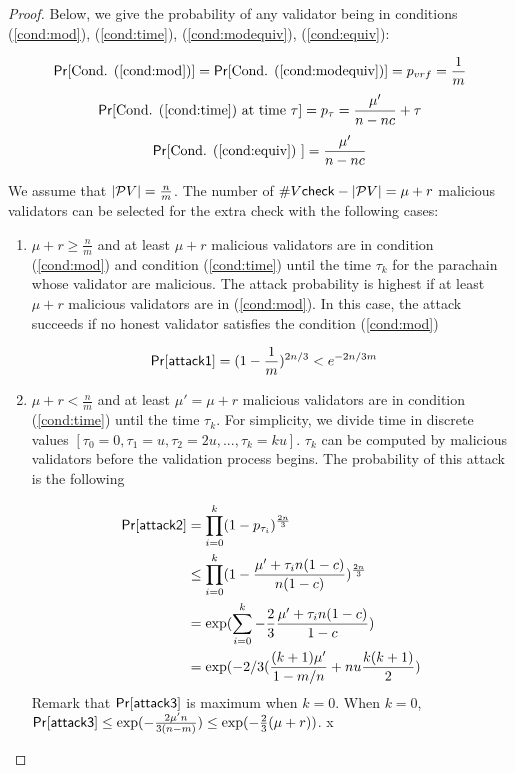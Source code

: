 \begin{proof}

Below, we give the probability of any validator being in conditions (\ref{cond:mod}), (\ref{cond:time}), (\ref{cond:modequiv}), (\ref{cond:equiv}):

$$\mathsf{Pr}[\text{Cond. (\ref{cond:mod})}] =\mathsf{Pr}[\text{Cond. (\ref{cond:modequiv})}] = p_{vrf} = \frac{1}{m}$$
$$\mathsf{Pr}[\text{Cond. (\ref{cond:time}) at time } \tau] = p_\tau =  \frac{\mu'}{n - nc} + \tau $$
$$\mathsf{Pr}[\text{Cond. (\ref{cond:equiv}) }] = \frac{\mu'}{n - nc} $$


We assume that $|\mathcal{P}V| = \frac{n}{m}$.  The number of $\#V\mathsf{check}-|\mathcal{P}V| = \mu + r$ malicious validators can be selected for the extra check  with the following cases:

\begin{enumerate}
    
    \item $\mu + r \geq \frac{n}{m}$ and at least $\mu + r$ malicious validators are in condition (\ref{cond:mod}) and condition (\ref{cond:time}) until the time $\tau_k$ for the parachain whose validator are malicious. The attack probability is highest if at least $\mu + r$
    malicious validators are in (\ref{cond:mod}). In this case, the attack succeeds if no honest validator satisfies the condition (\ref{cond:mod}) 
    
    
    \begin{align}\label{eq:attack2}
        \mathsf{Pr}[\mathsf{attack1}] &= (1-\frac{1}{m})^{2n/3} <  e^{-2n/3m} \nonumber
    \end{align}
    
    
    \item $\mu+r < \frac{n}{m}$ and at least $\mu' = \mu+r$ malicious validators are in condition (\ref{cond:time}) until the time $\tau_k$. For simplicity, we divide time in discrete values $[\tau_0 = 0, \tau_1 =u, \tau_2 = 2u, ..., \tau_k = ku]$. $\tau_k$ can be computed by malicious validators before the validation process begins. The probability of this attack is the following
    
    \begin{align}
        \mathsf{Pr}[\mathsf{attack2}] &= \prod_{i = 0}^k(1-p_{\tau_i})^{\frac{2n}{3}} \nonumber\\
        &\leq  \prod_{i = 0}^k (1 - \frac{\mu'+\tau_in(1-c)}{n(1-c)})^{\frac{2n}{3}} \nonumber\\
        &=  \exp(\sum_{i = 0}^k -\frac{2}{3}\frac{\mu' + \tau_in(1-c)}{1-c}) \nonumber\\
        & = \exp(-2/3(\frac{(k+1)\mu'}{1-m/n}+ nu\frac{k(k+1)}{2})\nonumber
    \end{align}
    Remark that $\mathsf{Pr}[\mathsf{attack3}]$ is maximum when $k = 0$. When $k = 0$, $\mathsf{Pr}[\mathsf{attack3}] \leq \exp(-\frac{2\mu' n}{3(n-m)}) \leq \exp(-\frac{2}{3}(\mu + r))$.
    x
    

\end{enumerate}
\end{proof}
